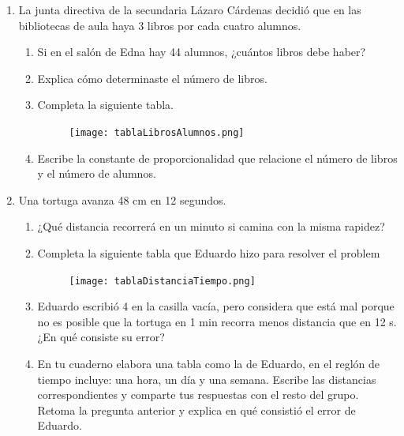 \begin{enumerate}
    \item La junta directiva de la secundaria Lázaro Cárdenas decidió que en las bibliotecas
          de aula haya 3 libros por cada cuatro alumnos.
          \begin{enumerate}
              \item Si en el salón de Edna hay 44 alumnos, ¿cuántos libros debe haber?
              \item Explica cómo determinaste el número de libros.
              \item Completa la siguiente tabla.
                    \begin{figure}[H]
                        \centering
                        \texttt{[image: tablaLibrosAlumnos.png]}
                        \label{fig:tablaLibrosAlumnos}
                    \end{figure}
              \item Escribe la constante de proporcionalidad que relacione el número de libros y el
                    número de alumnos.
          \end{enumerate}
    \item  Una tortuga avanza 48 cm en 12 segundos.
          \begin{enumerate}
              \item ¿Qué distancia recorrerá en un minuto si camina con la misma rapidez?
              \item Completa la siguiente tabla que Eduardo hizo para resolver el problem
                    \begin{figure}[H]
                        \centering
                        \texttt{[image: tablaDistanciaTiempo.png]}
                        \label{fig:tablaDistanciaTiempo}
                    \end{figure}
              \item Eduardo escribió 4 en la casilla vacía, pero considera que está mal porque no es
                    posible que la tortuga en 1 min recorra menos distancia que en 12 s. ¿En qué
                    consiste su error?
              \item En tu cuaderno elabora una tabla como la de Eduardo, en el reglón de tiempo
                    incluye: una hora, un día y una semana. Escribe las distancias correspondientes
                    y comparte tus respuestas con el resto del grupo. Retoma la pregunta anterior y
                    explica en qué consistió el error de Eduardo.
          \end{enumerate}



\end{enumerate}
